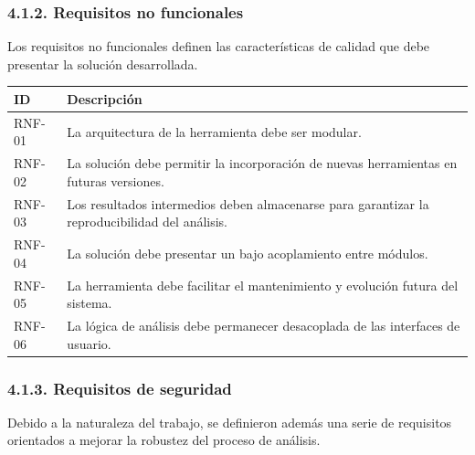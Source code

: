 \subsubsection{4.1.2. Requisitos no
funcionales}\label{requisitos-no-funcionales}

Los requisitos no funcionales definen las características de calidad que
debe presentar la solución desarrollada.

{\def\LTcaptype{none} %
\begin{longtable}[]{@{}
  >{\raggedright\arraybackslash}p{}
  >{\raggedright\arraybackslash}p{}@{}}
\toprule\noalign{}
\begin{minipage}[b]{\linewidth}\raggedright
ID
\end{minipage} & \begin{minipage}[b]{\linewidth}\raggedright
Descripción
\end{minipage} \\
\midrule\noalign{}
\endhead
\bottomrule\noalign{}
\endlastfoot
RNF-01 & La arquitectura de la herramienta debe ser modular. \\
RNF-02 & La solución debe permitir la incorporación de nuevas
herramientas en futuras versiones. \\
RNF-03 & Los resultados intermedios deben almacenarse para garantizar la
reproducibilidad del análisis. \\
RNF-04 & La solución debe presentar un bajo acoplamiento entre
módulos. \\
RNF-05 & La herramienta debe facilitar el mantenimiento y evolución
futura del sistema. \\
RNF-06 & La lógica de análisis debe permanecer desacoplada de las
interfaces de usuario. \\
\end{longtable}
}

\subsubsection{4.1.3. Requisitos de
seguridad}\label{requisitos-de-seguridad}

Debido a la naturaleza del trabajo, se definieron además una serie de
requisitos orientados a mejorar la robustez del proceso de análisis.

